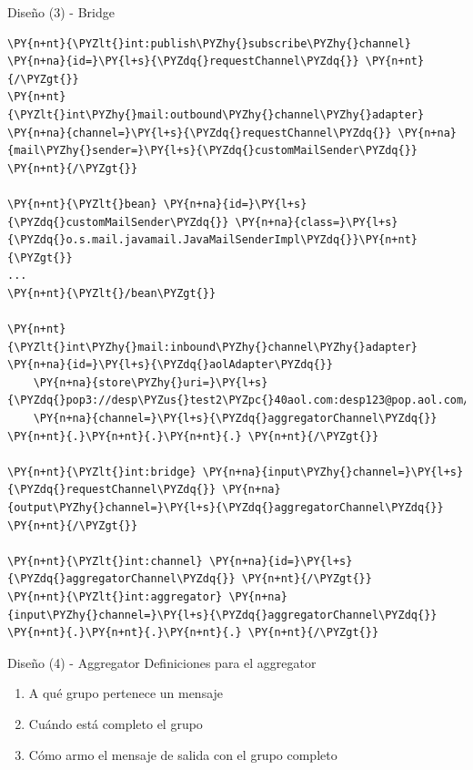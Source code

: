 \documentclass{beamer}
\begin{document}
\begin{frame}[fragile]{Diseño (3) - Bridge}
\begin{Verbatim}[fontsize=\tiny,commandchars=\\\{\}]
\PY{n+nt}{\PYZlt{}int:publish\PYZhy{}subscribe\PYZhy{}channel} \PY{n+na}{id=}\PY{l+s}{\PYZdq{}requestChannel\PYZdq{}} \PY{n+nt}{/\PYZgt{}}
\PY{n+nt}{\PYZlt{}int\PYZhy{}mail:outbound\PYZhy{}channel\PYZhy{}adapter} \PY{n+na}{channel=}\PY{l+s}{\PYZdq{}requestChannel\PYZdq{}} \PY{n+na}{mail\PYZhy{}sender=}\PY{l+s}{\PYZdq{}customMailSender\PYZdq{}} \PY{n+nt}{/\PYZgt{}}

\PY{n+nt}{\PYZlt{}bean} \PY{n+na}{id=}\PY{l+s}{\PYZdq{}customMailSender\PYZdq{}} \PY{n+na}{class=}\PY{l+s}{\PYZdq{}o.s.mail.javamail.JavaMailSenderImpl\PYZdq{}}\PY{n+nt}{\PYZgt{}}
...
\PY{n+nt}{\PYZlt{}/bean\PYZgt{}} 

\PY{n+nt}{\PYZlt{}int\PYZhy{}mail:inbound\PYZhy{}channel\PYZhy{}adapter} \PY{n+na}{id=}\PY{l+s}{\PYZdq{}aolAdapter\PYZdq{}}
    \PY{n+na}{store\PYZhy{}uri=}\PY{l+s}{\PYZdq{}pop3://desp\PYZus{}test2\PYZpc{}40aol.com:desp123@pop.aol.com/INBOX\PYZdq{}}
    \PY{n+na}{channel=}\PY{l+s}{\PYZdq{}aggregatorChannel\PYZdq{}} \PY{n+nt}{.}\PY{n+nt}{.}\PY{n+nt}{.} \PY{n+nt}{/\PYZgt{}}

\PY{n+nt}{\PYZlt{}int:bridge} \PY{n+na}{input\PYZhy{}channel=}\PY{l+s}{\PYZdq{}requestChannel\PYZdq{}} \PY{n+na}{output\PYZhy{}channel=}\PY{l+s}{\PYZdq{}aggregatorChannel\PYZdq{}} \PY{n+nt}{/\PYZgt{}}

\PY{n+nt}{\PYZlt{}int:channel} \PY{n+na}{id=}\PY{l+s}{\PYZdq{}aggregatorChannel\PYZdq{}} \PY{n+nt}{/\PYZgt{}}
\PY{n+nt}{\PYZlt{}int:aggregator} \PY{n+na}{input\PYZhy{}channel=}\PY{l+s}{\PYZdq{}aggregatorChannel\PYZdq{}} \PY{n+nt}{.}\PY{n+nt}{.}\PY{n+nt}{.} \PY{n+nt}{/\PYZgt{}}
\end{Verbatim}

\end{frame}

\begin{frame}{Diseño (4) - Aggregator}
Definiciones para el aggregator
\begin{enumerate}[<+->]
\item A qué grupo pertenece un mensaje
\item Cuándo está completo el grupo
\item Cómo armo el mensaje de salida con el grupo completo
\end{enumerate}
\end{frame}
\end{document}
